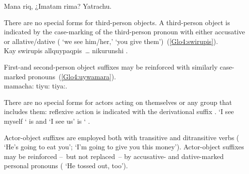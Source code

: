 %
{Mana riq, ¿Imatam rima? Yatrachu.}%
{}%
{}{}%

\noindent
There are no special forms for third-person objects. A third-person object is indicated by the case-marking of the third-person pronoun  with either accusative  or allative/dative  (  ‘we see him/her,’   ‘you give them’)~(\ref{Glo4:swirupis}).\\

%
{Kay swirupis allquypaqpis~\dots{} nikurunshi .}%
{}%
{}{}%

\noindent
First-and second-person object suffixes may be reinforced with similarly case-marked pronouns~(\ref{Glo4:uywamara}).\\

%
{  mamacha: tiyu: tiya:.}%
{}%
{}{}%

There are no special forms for actors acting on themselves or any group that includes them: reflexive action is indicated with the derivational suffix . ‘I see myself ‘ is   and ‘I see us’ is ‘  .

Actor-object suffixes are employed both with transitive and ditransitive verbs ( ‘He’s going to eat you’;  ‘I’m going to give you this money’). Actor-object suffixes may be reinforced --~but not replaced~-- by accusative- and dative-marked personal pronouns (  ‘He tossed  out, too’).

